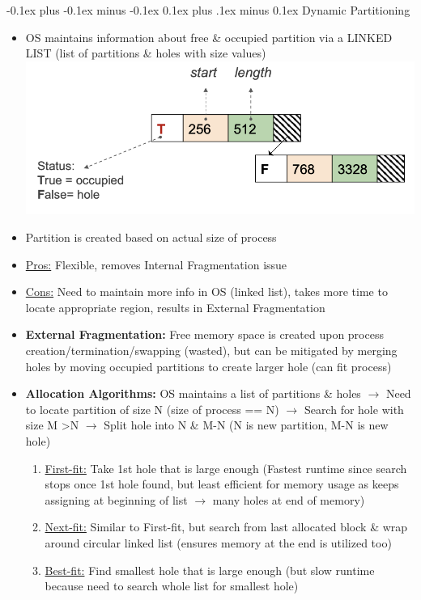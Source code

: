 \documentclass[landscape]{article}
\makeatletter
\renewcommand{\subsection}{\@startsection{subsection}{2}{0mm}%
  {-0.1ex plus -0.1ex minus -0.1ex}%
  {0.1ex plus .1ex minus 0.1ex}%
{\normalfont\scriptsize\bfseries}}
\makeatother
\begin{document}
\begin{multicols*}{6}
    \subsection{Dynamic Partitioning}
    \begin{itemize}
      \item OS maintains information about free \& occupied partition via a LINKED LIST (list of partitions \& holes with size values)
      \includegraphics[width = 0.8\linewidth]{13_dynamic_partitioning_list.png}
      \item Partition is created based on actual size of process
      \item \underline{Pros:} Flexible, removes Internal Fragmentation issue
      \item \underline{Cons:} Need to maintain more info in OS (linked list), takes more time to locate appropriate region, results in External Fragmentation
      \item \textbf{External Fragmentation:} Free memory space is created upon process creation/termination/swapping (wasted), but can be mitigated by merging holes by moving occupied partitions to create larger hole (can fit process)
      \item \textbf{Allocation Algorithms:} OS maintains a list of partitions \& holes $\rightarrow$ Need to locate partition of size N (size of process == N) $\rightarrow$ Search for hole with size M \textgreater N $\rightarrow$ Split hole into N \& M-N (N is new partition, M-N is new hole)
      \begin{enumerate}
        \item \underline{First-fit:} Take 1st hole that is large enough (Fastest runtime since search stops once 1st hole found, but least efficient for memory usage as keeps assigning at beginning of list $\rightarrow$ many holes at end of memory)
        \item \underline{Next-fit:} Similar to First-fit, but search from last allocated block \& wrap around circular linked list (ensures memory at the end is utilized too)
        \item \underline{Best-fit:} Find smallest hole that is large enough (but slow runtime because need to search whole list for smallest hole)

\end{enumerate}
\end{itemize}
\end{multicols*}
\end{document}
